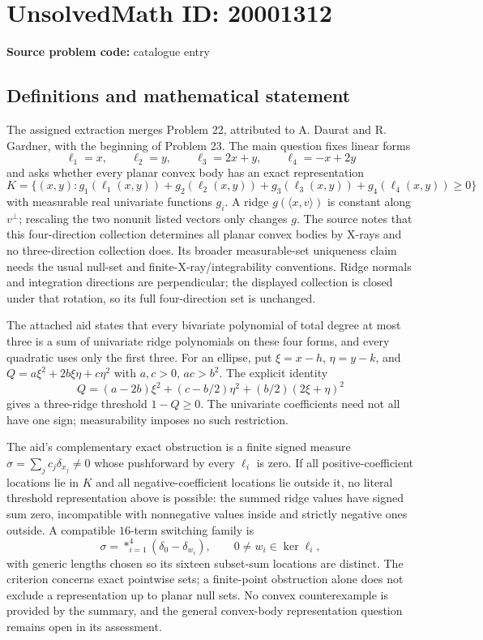 \documentclass[11pt]{article}
\begin{document}
\section*{UnsolvedMath ID: 20001312}
\textbf{Source problem code:} catalogue entry
\subsection{Definitions and mathematical statement}
The assigned extraction merges Problem 22, attributed to A. Daurat and R. Gardner, with the beginning of Problem 23. The main question fixes linear forms
\[
\ell_1=x,\qquad\ell_2=y,\qquad\ell_3=2x+y,\qquad\ell_4=-x+2y
\]
and asks whether every planar convex body has an exact representation
\[
K=\{(x,y):g_1(\ell_1(x,y))+g_2(\ell_2(x,y))+g_3(\ell_3(x,y))+g_4(\ell_4(x,y))\ge0\}
\]
with measurable real univariate functions $g_i$. A ridge $g(\langle x,v\rangle)$ is constant along $v^\perp$; rescaling the two nonunit listed vectors only changes $g$. The source notes that this four-direction collection determines all planar convex bodies by X-rays and no three-direction collection does. Its broader measurable-set uniqueness claim needs the usual null-set and finite-X-ray/integrability conventions. Ridge normals and integration directions are perpendicular; the displayed collection is closed under that rotation, so its full four-direction set is unchanged.

The attached aid states that every bivariate polynomial of total degree at most three is a sum of univariate ridge polynomials on these four forms, and every quadratic uses only the first three. For an ellipse, put $\xi=x-h$, $\eta=y-k$, and $Q=a\xi^2+2b\xi\eta+c\eta^2$ with $a,c>0$, $ac>b^2$. The explicit identity
\[
Q=(a-2b)\xi^2+(c-b/2)\eta^2+(b/2)(2\xi+\eta)^2
\]
gives a three-ridge threshold $1-Q\ge0$. The univariate coefficients need not all have one sign; measurability imposes no such restriction.

The aid's complementary exact obstruction is a finite signed measure $\sigma=\sum_jc_j\delta_{x_j}\ne0$ whose pushforward by every $\ell_i$ is zero. If all positive-coefficient locations lie in $K$ and all negative-coefficient locations lie outside it, no literal threshold representation above is possible: the summed ridge values have signed sum zero, incompatible with nonnegative values inside and strictly negative ones outside. A compatible $16$-term switching family is
\[
\sigma=\mathop{*}_{i=1}^4(\delta_0-\delta_{w_i}),\qquad0\ne w_i\in\ker\ell_i,
\]
with generic lengths chosen so its sixteen subset-sum locations are distinct. The criterion concerns exact pointwise sets; a finite-point obstruction alone does not exclude a representation up to planar null sets. No convex counterexample is provided by the summary, and the general convex-body representation question remains open in its assessment.
\end{document}

